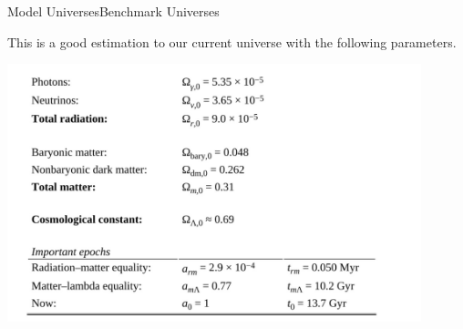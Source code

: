 \begin{frame}{Model Universes}{Benchmark Universes}

	This is a good estimation to our current universe with the following
	parameters.

	\includegraphics[width=0.9\textwidth]{5}
\end{frame}
